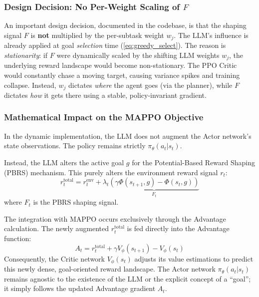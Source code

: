 \subsubsection{Design Decision: No Per-Weight Scaling of $F$}
\label{sec:no_f_scaling}

An important design decision, documented in the codebase, is that the
shaping signal $F$ is \textbf{not} multiplied by the per-subtask weight
$w_j$.
The LLM's influence is already applied at goal \emph{selection}
time (\cref{eq:greedy_select}).
The reason is \emph{stationarity}: if $F$ were dynamically scaled by
the shifting LLM weights $w_j$, the underlying reward landscape would
become non-stationary.
The PPO Critic would constantly chase a moving target, causing variance
spikes and training collapse.
Instead, $w_j$ dictates \emph{where} the agent goes (via the planner),
while $F$ dictates \emph{how} it gets there using a stable,
policy-invariant gradient.

\subsubsection{Mathematical Impact on the MAPPO Objective}
\label{sec:dyn_math_impact}

In the dynamic implementation, the LLM does not augment the Actor network's state observations. The policy remains strictly $\pi_\theta(a_t \vert{} s_t)$.

Instead, the LLM alters the active goal $g$ for the Potential-Based Reward Shaping (PBRS) mechanism. This purely alters the environment reward signal $r_t$:
\begin{equation}
    r_t^{\text{total}} = r_t^{\text{env}} + \lambda_t \underbrace{\left( \gamma \Phi(s_{t+1}, g) - \Phi(s_t, g) \right)}_{F_t}
\end{equation}
where $F_t$ is the PBRS shaping signal. 

The integration with MAPPO occurs exclusively through the Advantage calculation. The newly augmented $r_t^{\text{total}}$ is fed directly into the Advantage function:
\begin{equation}
    A_t = r_t^{\text{total}} + \gamma V_\phi(s_{t+1}) - V_\phi(s_t)
\end{equation}
Consequently, the Critic network $V_\phi(s_t)$ adjusts its value estimations to predict this newly dense, goal-oriented reward landscape. The Actor network $\pi_\theta(a_t \vert{} s_t)$ remains agnostic to the existence of the LLM or the explicit concept of a ``goal''; it simply follows the updated Advantage gradient $A_t$. 


